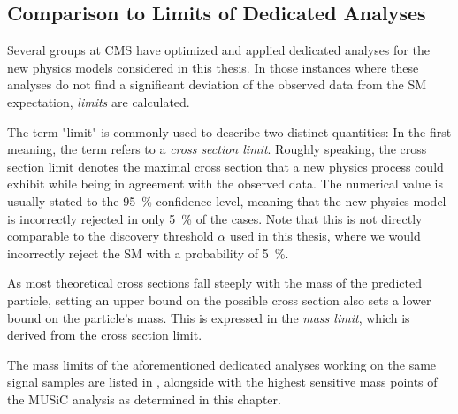 \subsection{Comparison to Limits of Dedicated Analyses}
Several groups at \ac{CMS} have optimized and applied dedicated analyses for the new physics models considered in this thesis. In those instances where these analyses do not find a significant deviation of the observed data from the \ac{SM} expectation, \emph{limits} are calculated.

The term "limit" is commonly used to describe two distinct quantities: In the first meaning, the term refers to a \emph{cross section limit}. Roughly speaking, the cross section limit denotes the maximal cross section that a new physics process could exhibit while being in agreement with the observed data. The numerical value is usually stated to the \SI{95}{\percent} confidence level, meaning that the new physics model is incorrectly rejected in only \SI{5}{\percent} of the cases. Note that this is not directly comparable to the discovery threshold $\alpha$ used in this thesis, where we would incorrectly reject the \acl{SM} with a probability of \SI{5}{\percent}.

As most theoretical cross sections fall steeply with the mass of the predicted particle, setting an upper bound on the possible cross section also sets a lower bound on the particle's mass. This is expressed in the \emph{mass limit}, which is derived from the cross section limit.

The mass limits of the aforementioned dedicated analyses working on the same signal samples are listed in , alongside with the highest sensitive mass points of the \ac{MUSiC} analysis as determined in this chapter. 

